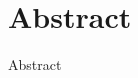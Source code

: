\documentclass{standalone}
\begin{document}
	\section{Abstract}
		Abstract \parencite{TronLightCycleBattle}
\end{document}
